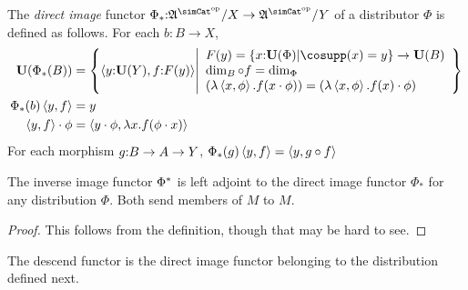 \documentclass[csh.tex]{subfiles}
\begin{document}
\begin{definition}
The \emph{direct image} functor $\Phi_*\of\ambient\s/X\to\ambient\s/Y$ of a distributor $\Phi$ is defined as follows. For each $b:B\to X$,
\begin{align*}
\base(\Phi_*(B)) &= \set{ \tuplet{y\of\base(Y),f\of F(y)}  \middle| 
\begin{array}{l}
F(y) = \set{x\of \base(\Phi)|\cosupp(x) = y}\to \base(B)\\
\dim_B\circ f = \dim_\Phi\\
(\function{\tuplet{x,\phi}}{f(x\cdot\phi)}) = (\function{\tuplet{x,\phi}}{f(x)\cdot\phi}) 
\end{array}
}\\
\Phi_*(b)\tuplet{y,f} &= y\\
\tuplet{y,f}\cdot \phi &= \tuplet{y\cdot \phi,\function x f(\phi\cdot x)}
\end{align*}
For each morphism $g\mathord : B\to A\to Y$, $\Phi_*(g)\left\langle y,f \right\rangle = \left\langle y,g\circ f \right\rangle$
\end{definition}

\begin{lemma}
The inverse image functor $\Phi^*$ is left adjoint to the direct image functor $\Phi_*$ for any distribution $\Phi$. Both send members of $M$ to $M$.
\end{lemma}

\begin{proof} This follows from the definition, though that may be hard to see.
\end{proof}

The descend functor is the direct image functor belonging to the distribution defined next.
\end{document}
